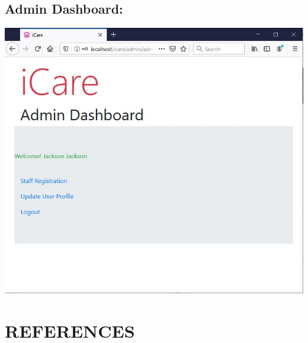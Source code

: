\documentclass[a4paper,12pt]{report}
\begin{document}
\section*{Admin Dashboard:}
\includegraphics[scale=0.8]{Implementation/adminDashboard.JPG}

\chapter*{REFERENCES}
\end{document}
